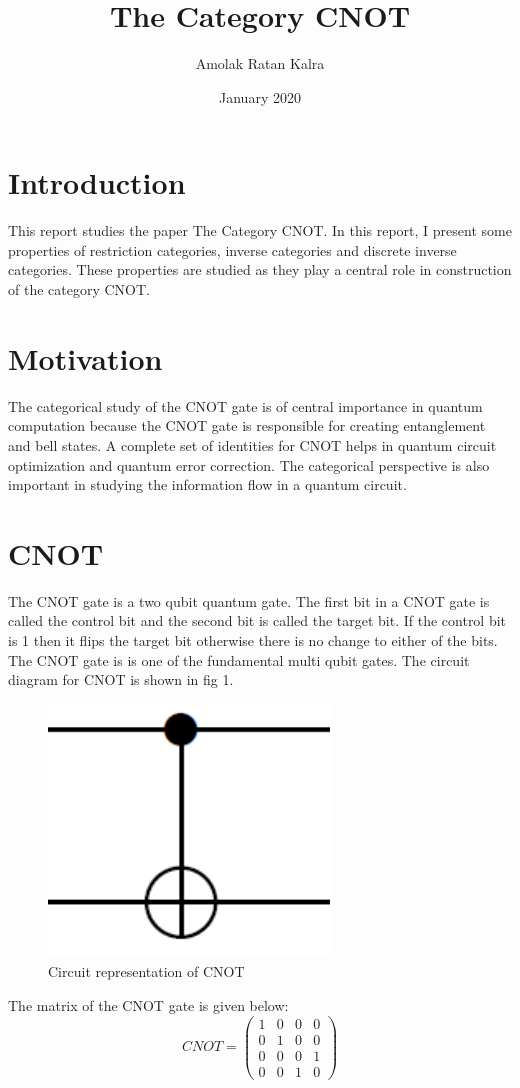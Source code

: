 \documentclass[11pt, oneside]{amsart}
\title{The Category CNOT}
\author{Amolak Ratan Kalra }
\date{January 2020}
\theoremstyle{definition}
\theoremstyle{definition}
\begin{document}
\maketitle
\tableofcontents
\section{Introduction}
This report studies the paper The Category CNOT{\cite{robin}}. In this report, I present some properties of restriction categories, inverse categories and discrete inverse categories. These properties are studied as they play a central role in construction of the category CNOT.
\section{Motivation}
The categorical study of the CNOT gate is of central importance in quantum computation because the CNOT gate is responsible for creating entanglement and bell states. A complete set of identities for CNOT helps in quantum circuit optimization and quantum error correction. The categorical perspective is also important in studying the information flow in a quantum circuit. 
\section{CNOT}
The CNOT gate is a two qubit quantum gate. The first bit in a CNOT gate is called the control bit and the second bit is called the target bit. If the control bit is 1 then it flips the target bit otherwise there is no change to either of the bits. The CNOT gate is is one of the fundamental multi qubit gates. The circuit diagram for CNOT is shown in fig 1.
\begin{figure}
    \centering
    \includegraphics[scale=0.5]{figure8.pdf}
    \caption{Circuit representation of CNOT}
\end{figure}
The matrix of the CNOT gate is given below:
\begin{equation*}
CNOT=
\begin{pmatrix}
1 & 0 & 0 & 0\\
0 & 1 & 0 & 0\\
0 & 0 & 0 & 1\\
0 & 0 & 1 & 0
\end{pmatrix}
\end{equation*}
\end{document}

